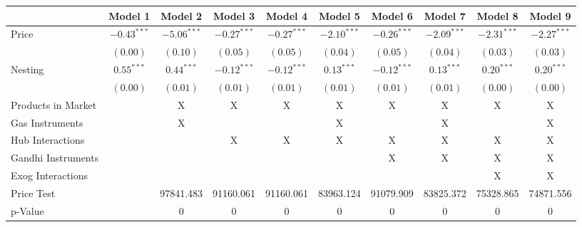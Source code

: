 
\begin{tabular}{l c c c c c c c c c}
\toprule
 & Model 1 & Model 2 & Model 3 & Model 4 & Model 5 & Model 6 & Model 7 & Model 8 & Model 9 \\
\midrule
Price                       & $-0.43^{***}$ & $-5.06^{***}$ & $-0.27^{***}$ & $-0.27^{***}$ & $-2.10^{***}$ & $-0.26^{***}$ & $-2.09^{***}$ & $-2.31^{***}$ & $-2.27^{***}$ \\
                            & $(0.00)$      & $(0.10)$      & $(0.05)$      & $(0.05)$      & $(0.04)$      & $(0.05)$      & $(0.04)$      & $(0.03)$      & $(0.03)$      \\
Nesting                     & $0.55^{***}$  & $0.44^{***}$  & $-0.12^{***}$ & $-0.12^{***}$ & $0.13^{***}$  & $-0.12^{***}$ & $0.13^{***}$  & $0.20^{***}$  & $0.20^{***}$  \\
                            & $(0.00)$      & $(0.01)$      & $(0.01)$      & $(0.01)$      & $(0.01)$      & $(0.01)$      & $(0.01)$      & $(0.00)$      & $(0.00)$      \\
\midrule
Products in Market          &               & X             & X             & X             & X             & X             & X             & X             & X             \\
Gas Instruments             &               & X             &               &               & X             &               & X             &               & X             \\
Hub Interactions            &               &               & X             & X             & X             & X             & X             & X             & X             \\
Gandhi Instruments          &               &               &               &               &               & X             & X             & X             & X             \\
Exog Interactions           &               &               &               &               &               &               &               & X             & X             \\
Price Test                  &               & 97841.483     & 91160.061     & 91160.061     & 83963.124     & 91079.909     & 83825.372     & 75328.865     & 74871.556     \\
p-Value                     &               & 0             & 0             & 0             & 0             & 0             & 0             & 0             & 0             \\

\end{tabular}
